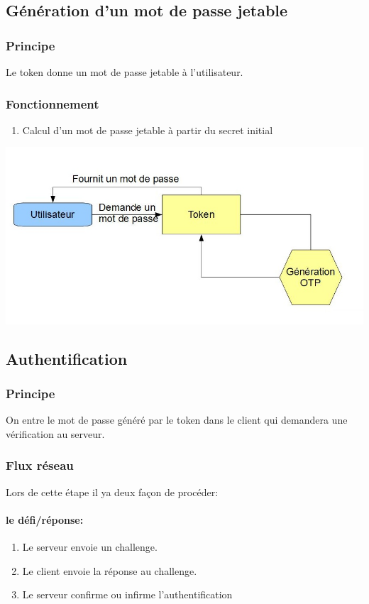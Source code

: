 \documentclass{"../../res/univ-projet"}
\begin{document}
\subsection{Génération d'un mot de passe jetable}
\subsubsection{Principe}
Le token donne un mot de passe jetable à l'utilisateur.

\subsubsection{Fonctionnement}
\begin{enumerate}
    \item Calcul d'un mot de passe jetable à partir du secret 
        initial
\end{enumerate}
\includegraphics[width=\textwidth]{../graphics/generation.jpg}

\subsection{Authentification}
\subsubsection{Principe}
On entre le mot de passe généré par le token dans le client qui demandera une
vérification au serveur.

\subsubsection{Flux réseau}
Lors de cette étape il ya deux façon de procéder:

    \paragraph{le défi/réponse:}
    \begin{enumerate}
        \item Le serveur envoie un challenge.
        \item Le client envoie la réponse au challenge.
        \item Le serveur confirme ou infirme l'authentification
    \end{enumerate}
\end{document}

